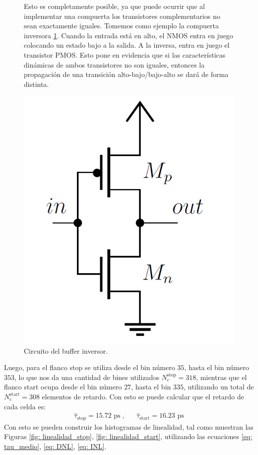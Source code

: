 \begin{figure}[h]
     \centering
     \begin{minipage}{0.5\textwidth}
          Esto es completamente posible, ya que puede ocurrir que al implementar una compuerta los transistores complementarios
           no sean exactamente iguales. Tomemos como ejemplo la compuerta inversora \ref{fig: buffer_inversor}. Cuando la entrada está
           en alto, el NMOS entra en juego colocando un estado bajo a la salida. A la inversa, entra en juego el transistor PMOS. Esto
           pone en evidencia que si las características dinámicas de ambos transistores no son iguales, entonces la propagación de una transición
           alto-bajo/bajo-alto se dará de forma distinta.
      \end{minipage}%
     \begin{minipage}{0.5\textwidth}
         \centering
         \includegraphics[width=0.4\linewidth]{imagenes/buffer_inversor.png}
         \caption{Circuito del buffer inversor.}
         \label{fig: buffer_inversor}
     \end{minipage}     
 \end{figure}

Luego, para el flanco stop se utiliza desde el bin número $35$, hasta el bin número $353$, lo que nos
da una cantidad de bines utilizados $N_c^{\text{stop}} = 318$, mientras que el flanco start
ocupa desde el bin número $27$, hasta el bin $335$, utilizando un total de $N_c^{\text{start}} = 308$
elementos de retardo. Con esto se puede calcular que el retardo de cada celda es:
\begin{align}
     \hat{\tau}_{\text{stop}} = 15.72 \text{ ps} \; , && \hat{\tau}_{\text{start}} = 16.23 \text{ ps}
\end{align}
Con esto se pueden construir los histogramas de linealidad, tal como muestran las Figuras \ref{fig: linealidad_stop}, \ref{fig: linealidad_start}, 
utilizando las ecuaciones \ref{eq: tau_medio}, \ref{eq: DNL}, \ref{eq: INL}.

